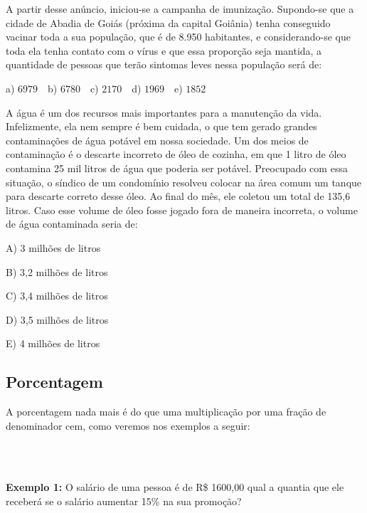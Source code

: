 \begin{multicols*}{2}
		      A partir desse anúncio, iniciou-se a campanha de imunização. Supondo-se que a cidade de Abadia de Goiás (próxima da capital Goiânia) tenha conseguido vacinar toda a sua população, que é de 8.950 habitantes, e considerando-se que toda ela tenha contato com o vírus e que essa proporção seja mantida, a quantidade de pessoas que terão sintomas leves nessa população será de:

		      a) $6979 \ \ \ $ b) $6780 \ \ \ $ c) $2170 \ \ \ $ d) $1969 \ \ \ $ e) $1852 \ \ $

		\execnum A água é um dos recursos mais importantes para a manutenção da vida. Infelizmente, ela nem sempre é bem cuidada, o que tem gerado grandes contaminações de água potável em nossa sociedade. Um dos meios de contaminação é o descarte incorreto de óleo de cozinha, em que 1 litro de óleo contamina 25 mil litros de água que poderia ser potável. Preocupado com essa situação, o síndico de um condomínio resolveu colocar na área comum um tanque para descarte correto desse  óleo. Ao final do mês, ele coletou um total de 135,6 litros. Caso esse volume de óleo fosse jogado fora de maneira incorreta, o volume de água contaminada seria de:

		      A) 3 milhões de litros

		      B) 3,2 milhões de litros

		      C) 3,4 milhões de litros

		      D) 3,5 milhões de litros

		      E) 4 milhões de litros


	\subsection*{Porcentagem}

	A porcentagem nada mais é do que uma multiplicação por uma fração de denominador cem, como veremos nos exemplos a seguir:

	\\

	\\


	\textbf{Exemplo 1:} O salário de uma pessoa é de R\$ 1600,00 qual a quantia que ele receberá se o salário aumentar 15\% na sua promoção?


\end{multicols*}
